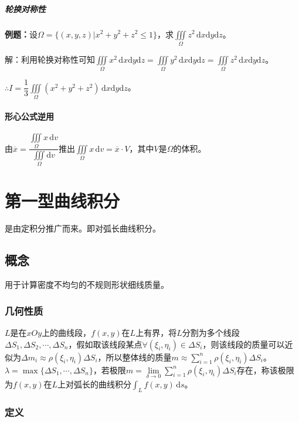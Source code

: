 \documentclass[UTF8, 12pt]{ctexart}
\begin{document}
\subparagraph{轮换对称性} \leavevmode \medskip

\textbf{例题：}设$\Omega=\{(x,y,z)|x^2+y^2+z^2\leqslant1\}$，求$\iiint\limits_\Omega z^2\,\textrm{d}x\textrm{d}y\textrm{d}z$。

解：利用轮换对称性可知$\iiint\limits_\Omega x^2\,\textrm{d}x\textrm{d}y\textrm{d}z=\iiint\limits_\Omega y^2\,\textrm{d}x\textrm{d}y\textrm{d}z=\iiint\limits_\Omega z^2\,\textrm{d}x\textrm{d}y\textrm{d}z$。

$\therefore I=\dfrac{1}{3}\iiint\limits_\Omega(x^2+y^2+z^2)\,\textrm{d}x\textrm{d}y\textrm{d}z$。

\paragraph{形心公式逆用} \leavevmode \medskip

由$\overline{x}=\dfrac{\iiint\limits_\Omega x\,\textrm{d}v}{\iiint\limits_\Omega\textrm{d}v}$推出$\iiint\limits_\Omega x\,\textrm{d}v=\overline{x}\cdot V$，其中$V$是$\Omega$的体积。

\section{第一型曲线积分}

是由定积分推广而来。即对弧长曲线积分。

\subsection{概念}

用于计算密度不均匀的不规则形状细线质量。

\subsubsection{几何性质}

$L$是在$xOy$上的曲线段，$f(x,y)$在$L$上有界，将$L$分割为多个线段$\Delta S_1,\Delta S_2,\cdots,\Delta S_n$，假如取该线段某点$\forall(\xi_i,\eta_i)\in\Delta S_i$，则该线段的质量可以近似为$\Delta m_i\approx\rho(\xi_i,\eta_i)\Delta S_i$，所以整体线的质量$m\approx\sum\limits_{i=1}^n\rho(\xi_i,\eta_i)\Delta S_i$。$\lambda=\max\{\Delta S_1,\cdots,\Delta S_n\}$，若极限$m=\lim\limits_{\delta\to0}\sum\limits_{i=1}^n\rho(\xi_i,\eta_i)\Delta S_i$存在，称该极限为$f(x,y)$在$L$上对弧长的曲线积分$\int_Lf(x,y)\,\textrm{d}s$。

\subsubsection{定义}
\end{document}
